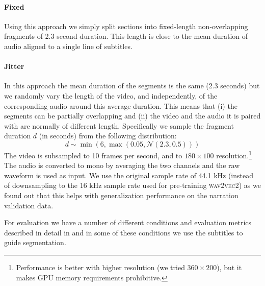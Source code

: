 \paragraph{Fixed} Using this approach we simply split sections into
fixed-length non-overlapping fragments of 2.3 second duration. This
length is close to the mean duration of audio aligned to a single line
of subtitles.

\paragraph{Jitter} In this approach the mean duration of the segments
is the same (2.3 seconds) but we randomly vary the length of the
video, and independently, of the corresponding audio around this
average duration. This means that (i) the segments can be partially
overlapping and (ii) the video and the audio it is paired with are
normally of different length. Specifically we sample the fragment
duration $d$ (in seconds)
from the following distribution:
\begin{equation}
  d \sim \min(6, \max(0.05, \mathcal{N}(2.3, 0.5)))
  \label{eq:jitter}
\end{equation}
The video is subsampled to 10 frames per second, and to
$180\times 100$ resolution.\footnote{Performance is better with higher
  resolution (we tried $360\times 200$), but it makes GPU memory
  requirements prohibitive.}  The audio is converted to mono by
averaging the two channels and the raw waveform is used as input. We
use the original sample rate of 44.1 kHz (instead of downsampling to
the 16 kHz sample rate used for pre-training \textsc{wav2vec2}) as we
found out that this helps with generalization performance on the
narration validation data.

For evaluation we have a number of different conditions and evaluation
metrics described in detail in  and in some of these
conditions we use the subtitles to guide
segmentation. 



